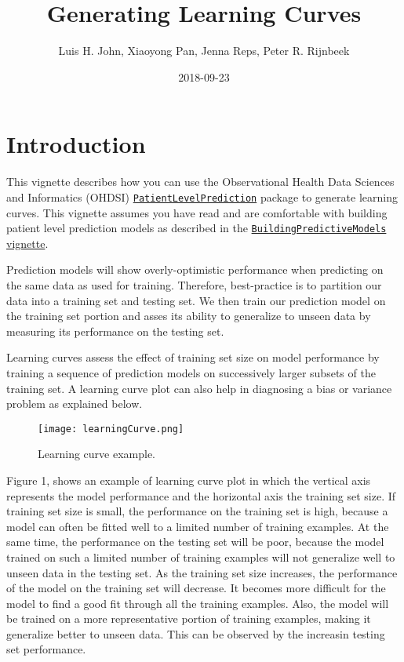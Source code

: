 \documentclass[]{article}
\title{Generating Learning Curves}
\author{Luis H. John, Xiaoyong Pan, Jenna Reps, Peter R. Rijnbeek}
\date{2018-09-23}
\begin{document}
\maketitle

{
\setcounter{tocdepth}{2}
\tableofcontents
}
\section{Introduction}\label{introduction}

This vignette describes how you can use the Observational Health Data
Sciences and Informatics (OHDSI)
\href{http://github.com/OHDSI/PatientLevelPrediction}{\texttt{PatientLevelPrediction}}
package to generate learning curves. This vignette assumes you have read
and are comfortable with building patient level prediction models as
described in the
\href{https://github.com/OHDSI/PatientLevelPrediction/blob/master/inst/doc/BuildingPredictiveModels.pdf}{\texttt{BuildingPredictiveModels}
vignette}.

Prediction models will show overly-optimistic performance when
predicting on the same data as used for training. Therefore,
best-practice is to partition our data into a training set and testing
set. We then train our prediction model on the training set portion and
asses its ability to generalize to unseen data by measuring its
performance on the testing set.

Learning curves assess the effect of training set size on model
performance by training a sequence of prediction models on successively
larger subsets of the training set. A learning curve plot can also help
in diagnosing a bias or variance problem as explained below.

\begin{figure}
\centering
\texttt{[image: learningCurve.png]}
\caption{Learning curve example.}
\end{figure}

Figure 1, shows an example of learning curve plot in which the vertical
axis represents the model performance and the horizontal axis the
training set size. If training set size is small, the performance on the
training set is high, because a model can often be fitted well to a
limited number of training examples. At the same time, the performance
on the testing set will be poor, because the model trained on such a
limited number of training examples will not generalize well to unseen
data in the testing set. As the training set size increases, the
performance of the model on the training set will decrease. It becomes
more difficult for the model to find a good fit through all the training
examples. Also, the model will be trained on a more representative
portion of training examples, making it generalize better to unseen
data. This can be observed by the increasin testing set performance.
\end{document}
